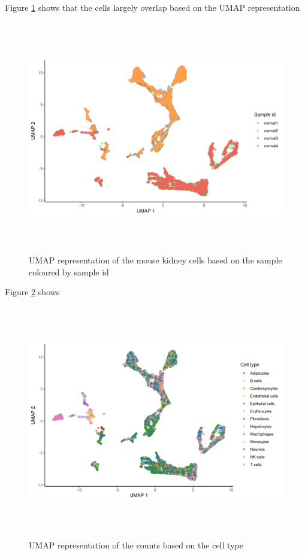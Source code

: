 Figure \ref{fig:UMAP_mouse_sample}  shows that the cells largely overlap based on the UMAP representation 

\begin{figure}[!htb]
\begin{center}
\includegraphics[width=6in,height=4in]{figure/kidney_mouse/UMAP_sample_id.png}
\end{center}
\caption{UMAP representation of the mouse kidney cells based on the sample coloured by sample id}
\label{fig:UMAP_mouse_sample}
\end{figure}
\FloatBarrier

Figure \ref{fig:UMAP_mouse_cell_type} shows 

\begin{figure}[!htb]
\begin{center}
\includegraphics[width=6in,height=4in]{figure/kidney_mouse/UMAP_cell_type.png}
\end{center}
\caption{UMAP representation of the counts based on the cell type}
\label{fig:UMAP_mouse_cell_type}
\end{figure}
\FloatBarrier

